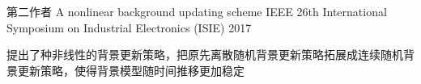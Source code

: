


\begin{cventries}


\cventry
{第二作者} %
{A nonlinear background updating scheme} %
{IEEE 26th International Symposium on Industrial Electronics (ISIE)} %
{2017} %
{ %
\begin{cvitems}
\item {提出了种非线性的背景更新策略，把原先离散随机背景更新策略拓展成连续随机背景更新策略，使得背景模型随时间推移更加稳定}
\end{cvitems}
}


\end{cventries}